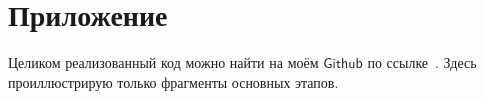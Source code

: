 \section*{Приложение}
\label{sec:Apendix} 


Целиком реализованный код можно найти на моём $\mathsf{Github}$ по ссылке~\cite{github}. Здесь проиллюстрирую только фрагменты основных этапов.








